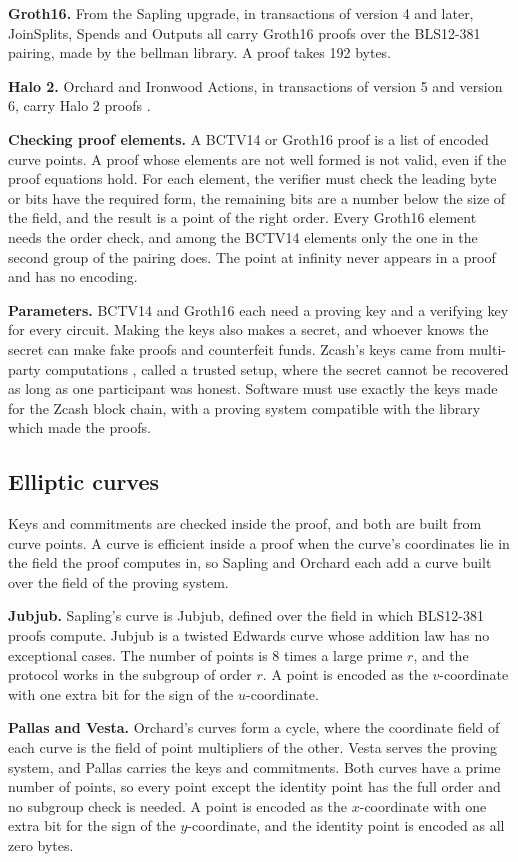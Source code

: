 \documentclass{article}
\let\oldcite\cite
\renewcommand{\cite}[2][]{\raisebox{0ex}{\oldcite[{#1}]{#2}}}
\newcommand{\lsubsection}[2]{\def\sectionlabel{#2} \subsection{#1}\label{#2}}
\theoremstyle{labelledtheorem} %
\begin{document}
\textbf{Groth16.} From the Sapling upgrade, in transactions of version 4 and later, JoinSplits, Spends and Outputs all carry Groth16 proofs over the BLS12-381 pairing, made by the bellman library. A proof takes 192 bytes.

\textbf{Halo 2.} Orchard and Ironwood Actions, in transactions of version 5 and version 6, carry Halo 2 proofs \cite{Zcash-halo2}.

\textbf{Checking proof elements.} A BCTV14 or Groth16 proof is a list of encoded curve points. A proof whose elements are not well formed is not valid, even if the proof equations hold. For each element, the verifier must check the leading byte or bits have the required form, the remaining bits are a number below the size of the field, and the result is a point of the right order. Every Groth16 element needs the order check, and among the BCTV14 elements only the one in the second group of the pairing does. The point at infinity never appears in a proof and has no encoding.

\textbf{Parameters.} BCTV14 and Groth16 each need a proving key and a verifying key for every circuit. Making the keys also makes a secret, and whoever knows the secret can make fake proofs and counterfeit funds. Zcash's keys came from multi-party computations \cite{BGG2017} \cite{BGM2017}, called a trusted setup, where the secret cannot be recovered as long as one participant was honest. Software must use exactly the keys made for the Zcash block chain, with a proving system compatible with the library which made the proofs.

\lsubsection{Elliptic curves}{readablecurves}
\label{jubjub}%

Keys and commitments are checked inside the proof, and both are built from curve points. A curve is efficient inside a proof when the curve's coordinates lie in the field the proof computes in, so Sapling and Orchard each add a curve built over the field of the proving system.

\textbf{Jubjub.} Sapling's curve is Jubjub, defined over the field in which BLS12-381 proofs compute. Jubjub is a twisted Edwards curve whose addition law has no exceptional cases. The number of points is 8 times a large prime $r$, and the protocol works in the subgroup of order $r$. A point is encoded as the $v$-coordinate with one extra bit for the sign of the $u$-coordinate.

\textbf{Pallas and Vesta.} Orchard's curves form a cycle, where the coordinate field of each curve is the field of point multipliers of the other. Vesta serves the proving system, and Pallas carries the keys and commitments. Both curves have a prime number of points, so every point except the identity point has the full order and no subgroup check is needed. A point is encoded as the $x$-coordinate with one extra bit for the sign of the $y$-coordinate, and the identity point is encoded as all zero bytes.
\end{document}
